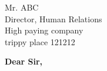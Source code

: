 \documentclass[a4paper, 11pt]{letter}
\begin{document}
\begin{letter}{
Mr. ABC \\
Director, Human Relations \\
High paying company\\
trippy place 121212} %

\opening{\textbf{Dear Sir,}}


\end{letter}
\end{document}
